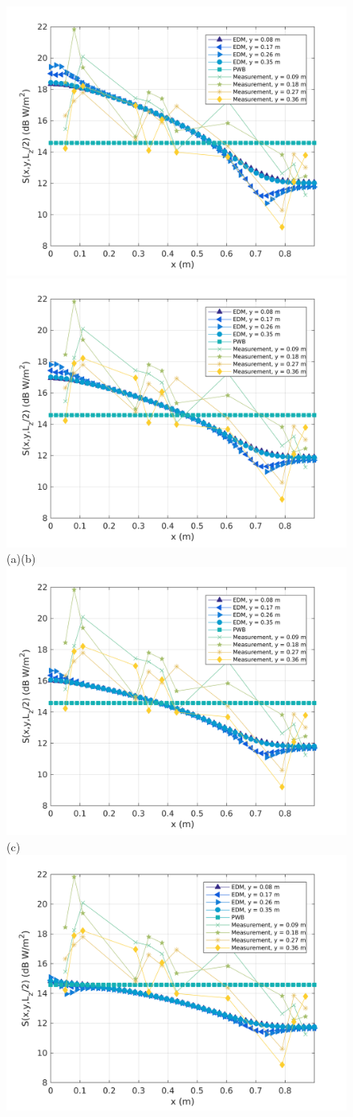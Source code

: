 \documentclass[a4paper]{article}
\numberwithin{equation}{section}
\begin{document}
\begin{figure}[ht]
\begin{center}
\includegraphics[width=0.49\linewidth]{figures/SDM_3D_SL_PowerDensityProfileXMeas_JX_k0_5}
\includegraphics[width=0.49\linewidth]{figures/SDM_3D_SL_PowerDensityProfileXMeas_JX_k0_75}\\
{\footnotesize (a)\hspace{75mm}(b)}\\
\includegraphics[width=0.5\linewidth]{figures/SDM_3D_SL_PowerDensityProfileXMeas_JX_k1_0}\\
{\footnotesize (c)}\\
\includegraphics[width=0.49\linewidth]{figures/SDM_3D_SL_PowerDensityProfileXMeas_JX_k1_5}

\end{center}
\end{figure}
\end{document}
